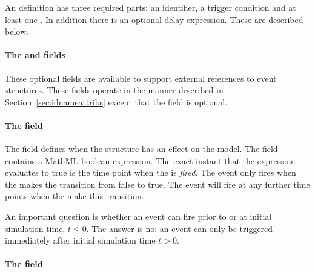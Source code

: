 \subsubsection{}

An \Event definition has three required parts: an identifier, a
trigger condition and at least one \EventAssignment. In addition
there is an optional delay expression.  These are described below.


\paragraph{The  and  fields}
\label{sec:event-id-name}

These optional fields are available to support external references
to event structures.  These fields operate in the manner described
in Section~\ref{sec:idnameattribs} except that the 
field is optional.


\paragraph{The  field}
\label{sec:event-trigger}

The  field defines when the \Event structure has an
effect on the model.  The  field contains a MathML
boolean expression.  The exact instant that the expression
evaluates to true is the time point when the \Event is
\emph{fired}.  The event only fires when the  makes
the transition from false to true.  The event will fire at any
further time points when the  make this transition.

An important question is whether an event can fire prior to or at
initial simulation time, \ie $t \leq 0$.  The answer is no: an
event can only be triggered immediately after initial simulation
time \ie $t > 0$.




\paragraph{The  field}
\label{sec:event-delay}


